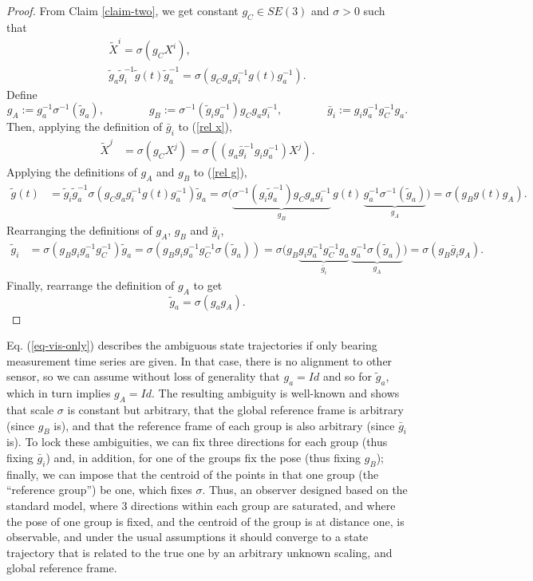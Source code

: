 \documentclass[]{article}
\def\gw{\tilde{g}}
\def\Xw{\tilde{X}}
\def\g{g}
\def\inv{^{-1}}
\begin{document}
\begin{proof}
From Claim \ref{claim-two}, we get constant $g_C\in SE(3)$ and $\sigma>0$ such that 
\begin{gather}
\Xw^i=\sigma(g_CX^i), \label{rel x}\\
\gw_a \gw_i\inv \gw(t)\gw_a\inv = \sigma(g_Cg_ag\inv_ig(t)g_a\inv). \label{rel g}
\end{gather}
Define
$$
g_A := g_a\inv\sigma\inv(\gw_a),
\qquad\qquad
g_B :=\sigma\inv(\gw_i\g_a\inv)g_Cg_ag_i\inv,
\qquad\qquad
\bar g_i := g_ig_a\inv g_C\inv g_a. 
$$
Then, applying the definition of $\bar g_i$ to (\ref{rel x}),
\begin{align*}
\Xw^j &= \sigma(g_C X^j)
= \sigma((g_a\bar g_i\inv g_i g_a\inv) X^j).
\end{align*}
Applying the definitions of $g_A$ and $g_B$ to (\ref{rel g}),
\begin{align*}
\gw(t) &= \gw_i\gw_a\inv\sigma(g_Cg_ag_i\inv g(t)g_a\inv)\gw_a
= \sigma\bigl(
\underset{g_B}{\underbrace{\sigma\inv(g_i \gw_a\inv) g_C g_a g_i\inv}}\,
g(t)\,
\underset{g_A}{\underbrace{g_a\inv \sigma\inv(\gw_a)}}
\bigr)
= \sigma(g_B g(t) g_A).
\end{align*}
Rearranging the definitions of $g_A$, $g_B$ and $\bar g_i$,
\begin{align*}
\gw_i &= \sigma(g_B g_i g_a\inv g_C\inv)\gw_a
=\sigma\left(g_B g_i g_a\inv g_C\inv \sigma(\gw_a)\right)
=\sigma\bigl(g_B 
\underset{\bar g_i}{\underbrace{g_i g_a\inv g_C\inv g_a}}\,
\underset{g_A}{\underbrace{g_a\inv \sigma(\gw_a)}}
\bigr)
=\sigma(g_B\bar g_i g_A).
\end{align*}
Finally, rearrange the definition of $g_A$ to get
$$\gw_a = \sigma(g_ag_A).$$

\end{proof}
Eq. (\ref{eq-vis-only}) describes the ambiguous state trajectories if only bearing measurement time series are given. In that case, there is no alignment to other sensor, so we can assume without loss of generality that $g_a = Id$ and so for $\gw_a$, which in turn implies $g_A = Id$. The resulting ambiguity is well-known \cite{soatto97} and shows that scale $\sigma$ is constant but arbitrary, that the global reference frame is arbitrary (since $g_B$ is), and that the reference frame of each group is also arbitrary (since $\bar g_i$ is). To lock these ambiguities, we can fix three directions for each group (thus fixing $\bar g_i$) and, in addition, for one of the groups fix the pose (thus fixing $g_B$); finally, we can impose that the centroid of the points in that one group (the ``reference group'') be one, which fixes $\sigma$. Thus, an observer designed based on the standard model, where $3$ directions within each group are saturated, and where the pose of one group is fixed, and the centroid of 
the 
group is at distance one, is observable, and under the usual assumptions it should converge to a state trajectory that is related to the true one by an arbitrary unknown scaling, and global reference frame.
\end{document}
